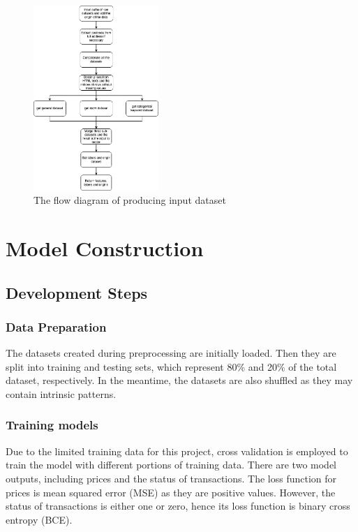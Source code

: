 \documentclass[12pt,twoside]{report}
\begin{document}
\begin{figure}[!htbp]
	\centering
	\includegraphics[height=7cm]{create_input_dataset}
	\caption{The flow diagram of producing  input dataset}
	\label{create_input_dataset}
\end{figure}

\section{Model Construction}

\subsection{Development Steps}
\subsubsection{Data Preparation}
The datasets created during preprocessing are initially loaded. Then they are split into training and testing sets, which represent 80\% and 20\% of the total dataset, respectively. In the meantime, the datasets are also shuffled as they may contain intrinsic patterns.

\subsubsection{Training models}
Due to the limited training data for this project, cross validation is employed to train the model with different portions of training data. There are two model outputs, including prices and the status of transactions. The loss function for prices is mean squared error (MSE) as they are positive values. However, the status of transactions is either one or zero, hence its loss function is binary cross entropy (BCE). 
\\
\end{document}
